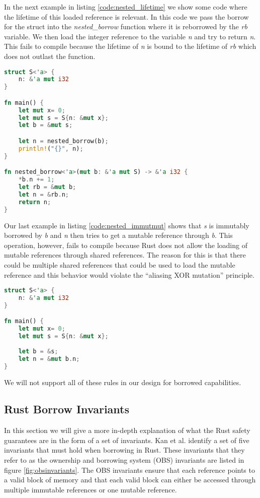 In the next example in listing \ref{code:nested_lifetime} we show some code where the lifetime of this loaded reference is relevant.
In this code we pass the borrow for the struct into the \textit{nested\_borrow} function where it is reborrowed by the \textit{rb} variable.
We then load the integer reference to the variable \textit{n} and try to return \textit{n}.
This fails to compile because the lifetime of \textit{n} is bound to the lifetime of \textit{rb} which does not outlast the function.

\begin{lstlisting}[language=Rust,frame=single,caption=Reborrow Example,label=code:nested_lifetime]
struct S<'a> {
    n: &'a mut i32
}

fn main() {
    let mut x= 0;
    let mut s = S{n: &mut x};
    let b = &mut s;

    let n = nested_borrow(b);
    println!("{}", n);
}

fn nested_borrow<'a>(mut b: &'a mut S) -> &'a i32 {
    *b.n += 1;
    let rb = &mut b;
    let n = &rb.n;
    return n;
}
\end{lstlisting}

Our last example in listing \ref{code:nested_immutmut} shows that \textit{s} is immutably borrowed by \textit{b} and \textit{n} then tries to get a mutable reference through \textit{b}.
This operation, however, fails to compile because Rust does not allow the loading of mutable references through shared references.
The reason for this is that there could be multiple shared references that could be used to load the mutable reference and this behavior would violate the ``aliasing XOR mutation'' principle.
\begin{lstlisting}[language=Rust,frame=single,caption=Mutable reference through shared borrow,label=code:nested_immutmut]
struct S<'a> {
    n: &'a mut i32
}

fn main() {
    let mut x= 0;
    let mut s = S{n: &mut x};
    
    let b = &s;
    let n = &mut b.n;
}
\end{lstlisting}

We will not support all of these rules in our design for borrowed capabilities.

\subsection{Rust Borrow Invariants}
\label{sec:obsinvariants}
In this section we will give a more in-depth explanation of what the Rust safety guarantees are in the form of a set of invariants.
Kan et al. \cite{Kan2018AnEO} identify a set of five invariants that must hold when borrowing in Rust.
These invariants that they refer to as the ownership and borrowing system (OBS) invariants are listed in figure \ref{fig:obsinvariants}.
The OBS invariants ensure that each reference points to a valid block of memory and that each valid block can either be accessed through multiple immutable references or one mutable reference.


